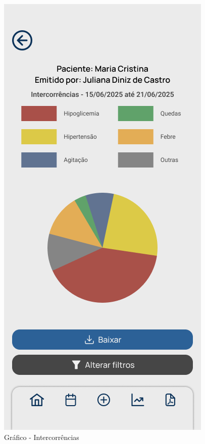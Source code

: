 \begin{figure}[!htbp]
	\centering
	\includegraphics[width=0.6\linewidth]{MyMed - Modelagem/Gráfico - Intercorrências.png}
	\caption{Gráfico - Intercorrências}
	\label{grafico_intercorrencias}
\end{figure}

